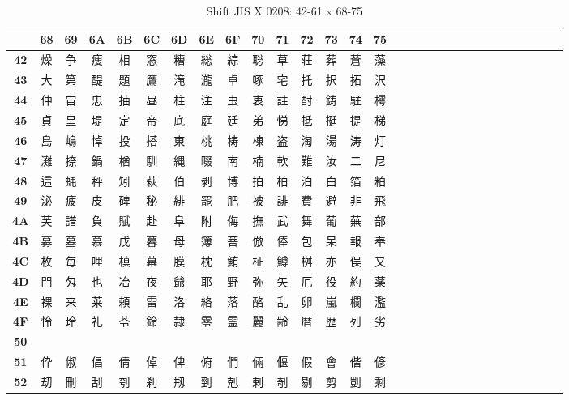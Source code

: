\begin{table}[H]
\Fontified
\centering
\caption{Shift JIS X 0208: 42-61 x 68-75}
\begin{tabular}{|Sc|Sc|Sc|Sc|Sc|Sc|Sc|Sc|Sc|Sc|Sc|Sc|Sc|Sc|Sc|}
\hline
 & \textbf{68} & \textbf{69} & \textbf{6A} & \textbf{6B} & \textbf{6C} & \textbf{6D} & \textbf{6E} & \textbf{6F} & \textbf{70} & \textbf{71} & \textbf{72} & \textbf{73} & \textbf{74} & \textbf{75} \\ \hline
\textbf{42} & 燥 & 争 & 痩 & 相 & 窓 & 糟 & 総 & 綜 & 聡 & 草 & 荘 & 葬 & 蒼 & 藻 \\ \hline
\textbf{43} & 大 & 第 & 醍 & 題 & 鷹 & 滝 & 瀧 & 卓 & 啄 & 宅 & 托 & 択 & 拓 & 沢 \\ \hline
\textbf{44} & 仲 & 宙 & 忠 & 抽 & 昼 & 柱 & 注 & 虫 & 衷 & 註 & 酎 & 鋳 & 駐 & 樗 \\ \hline
\textbf{45} & 貞 & 呈 & 堤 & 定 & 帝 & 底 & 庭 & 廷 & 弟 & 悌 & 抵 & 挺 & 提 & 梯 \\ \hline
\textbf{46} & 島 & 嶋 & 悼 & 投 & 搭 & 東 & 桃 & 梼 & 棟 & 盗 & 淘 & 湯 & 涛 & 灯 \\ \hline
\textbf{47} & 灘 & 捺 & 鍋 & 楢 & 馴 & 縄 & 畷 & 南 & 楠 & 軟 & 難 & 汝 & 二 & 尼 \\ \hline
\textbf{48} & 這 & 蝿 & 秤 & 矧 & 萩 & 伯 & 剥 & 博 & 拍 & 柏 & 泊 & 白 & 箔 & 粕 \\ \hline
\textbf{49} & 泌 & 疲 & 皮 & 碑 & 秘 & 緋 & 罷 & 肥 & 被 & 誹 & 費 & 避 & 非 & 飛 \\ \hline
\textbf{4A} & 芙 & 譜 & 負 & 賦 & 赴 & 阜 & 附 & 侮 & 撫 & 武 & 舞 & 葡 & 蕪 & 部 \\ \hline
\textbf{4B} & 募 & 墓 & 慕 & 戊 & 暮 & 母 & 簿 & 菩 & 倣 & 俸 & 包 & 呆 & 報 & 奉 \\ \hline
\textbf{4C} & 枚 & 毎 & 哩 & 槙 & 幕 & 膜 & 枕 & 鮪 & 柾 & 鱒 & 桝 & 亦 & 俣 & 又 \\ \hline
\textbf{4D} & 門 & 匁 & 也 & 冶 & 夜 & 爺 & 耶 & 野 & 弥 & 矢 & 厄 & 役 & 約 & 薬 \\ \hline
\textbf{4E} & 裸 & 来 & 莱 & 頼 & 雷 & 洛 & 絡 & 落 & 酪 & 乱 & 卵 & 嵐 & 欄 & 濫 \\ \hline
\textbf{4F} & 怜 & 玲 & 礼 & 苓 & 鈴 & 隷 & 零 & 霊 & 麗 & 齢 & 暦 & 歴 & 列 & 劣 \\ \hline
\textbf{50} &  &  &  &  &  &  &  &  &  &  &  &  &  &  \\ \hline
\textbf{51} & 伜 & 俶 & 倡 & 倩 & 倬 & 俾 & 俯 & 們 & 倆 & 偃 & 假 & 會 & 偕 & 偐 \\ \hline
\textbf{52} & 刧 & 刪 & 刮 & 刳 & 刹 & 剏 & 剄 & 剋 & 剌 & 剞 & 剔 & 剪 & 剴 & 剩 \\ \hline

\end{tabular}
\end{table}
